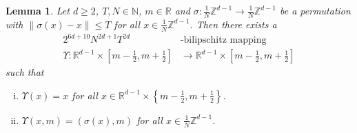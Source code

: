 \documentclass[a4paper, bibliography=totoc]{scrartcl}
\newtheorem{lemma}[define]{Lemma}
\numberwithin{claimcounter}{define}
\newcommand{\R}{\mathbb{R}}
\newcommand{\Z}{\mathbb{Z}}
\newcommand{\N}{\mathbb{N}}
\newcommand{\enorm}[1]{\left\|#1\right\|}
\newcommand{\set}[1]{\left\{#1\right\}}
\newcommand{\sqbr}[1]{\left[#1\right]}
\begin{document}
\begin{lemma}\label{lemma:_specific_applied_permute}
	Let $d\geq 2$, $T,N\in \N$, $m\in\R$ and $\sigma\colon \frac{1}{N}\Z^{d-1}\to \frac{1}{N}\Z^{d-1}$ be a permutation with $\enorm{\sigma(x)-x}\leq T$ for all $x\in \frac{1}{N}\Z^{d-1}$. Then there exists a
	\begin{align*}
	2^{6d+10}N^{2d+1}T^{2d}&\text{-bilipschitz mapping}\\
	\Upsilon\colon\R^{d-1}\times\sqbr{m-\frac{1}{2},m+\frac{1}{2}}&\to \R^{d-1}\times \sqbr{m-\frac{1}{2},m+\frac{1}{2}}
	\end{align*}
	such that 
	\begin{enumerate}[(i)]
		\item $\Upsilon(x)=x$ for all $x\in\R^{d-1}\times \set{m-\frac{1}{2},m+\frac{1}{2}}$.
		\item $\Upsilon(x,m)=(\sigma(x),m)$ for all $x\in \frac{1}{N}\Z^{d-1}$.
	\end{enumerate}
\end{lemma}
\end{document}
